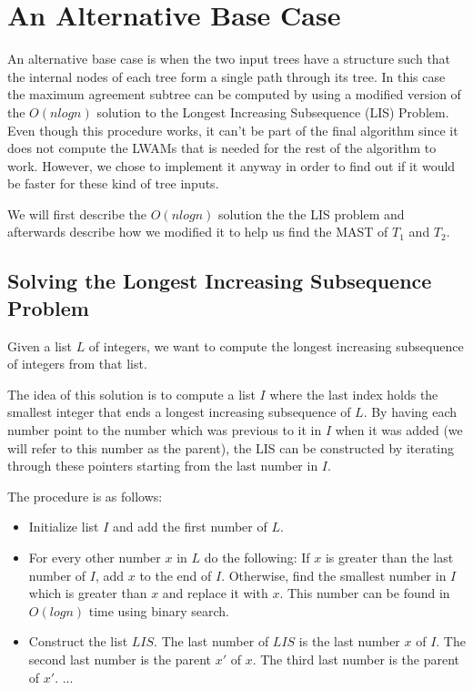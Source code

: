 \section{An Alternative Base Case}
An alternative base case is when the two input trees have a structure such that the internal nodes of each tree form a single path through its tree. In this case the maximum agreement subtree can be computed by using a modified version of the $O(nlogn)$ solution to the Longest Increasing Subsequence (LIS) Problem. Even though this procedure works, it can't be part of the final algorithm since it does not compute the LWAMs that is needed for the rest of the algorithm to work. However, we chose to implement it anyway in order to find out if it would be faster for these kind of tree inputs.

We will first describe the $O(nlogn)$ solution the the LIS problem and afterwards describe how we modified it to help us find the MAST of $T_1$ and $T_2$.

\subsection{Solving the Longest Increasing Subsequence Problem}
Given a list $L$ of integers, we want to compute the longest increasing subsequence of integers from that list.


The idea of this solution is to compute a list $I$ where the last index holds the smallest integer that ends a longest increasing subsequence of $L$. By having each number point to the number which was previous to it in $I$ when it was added (we will refer to this number as the parent), the LIS can be constructed by iterating through these pointers starting from the last number in $I$.

The procedure is as follows:

\begin{itemize}
	\item Initialize list $I$ and add the first number of $L$.
	\item For every other number $x$ in $L$ do the following:
	\subitem If $x$ is greater than the last number of $I$, add $x$ to the end of $I$.
	\subitem Otherwise, find the smallest number in $I$ which is greater than $x$ and replace it with $x$. This number can be found in $O(logn)$ time using binary search.
	\item Construct the list $LIS$.
	\subitem The last number of $LIS$ is the last number $x$ of $I$.
	\subitem The second last number is the parent $x'$ of $x$.
	\subitem The third last number is the parent of $x'$.
	\subitem ...
\end{itemize}

